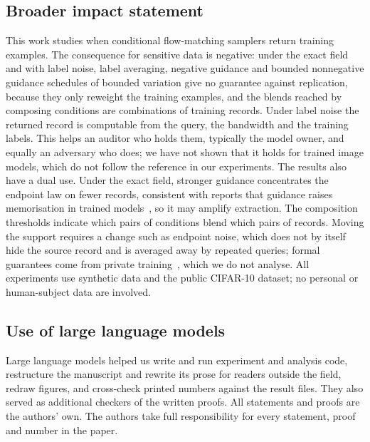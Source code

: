 \documentclass{article} %
\theoremstyle{plain}
\theoremstyle{definition}
\theoremstyle{remark}
\begin{document}
\subsection*{Broader impact statement}
This work studies when conditional flow-matching samplers return training examples. The
consequence for sensitive data is negative: under the exact field and with label noise, label
averaging, negative guidance and bounded nonnegative guidance schedules of bounded variation give
no guarantee against replication, because
they only reweight the training examples, and the blends reached by composing conditions are
combinations of training records. Under label noise the returned record is computable from the
query, the bandwidth and the training labels. This helps an auditor who holds them, typically the
model owner, and equally an adversary who does; we have not shown that it holds for trained image
models, which do not follow the reference in our experiments. The results also have a dual use. Under
the exact field, stronger guidance concentrates the endpoint law on fewer records, consistent
with reports that guidance raises memorisation in trained models~\citep{jain2025attraction,kim2025how},
so it may amplify extraction. The composition thresholds indicate which pairs of conditions
blend which pairs of records. Moving the support requires a change such as endpoint noise, which
does not by itself hide the source record and is averaged away by repeated queries; formal
guarantees come from private training~\citep{dockhorn2023differentially}, which we do not analyse.
All experiments use synthetic data and the public CIFAR-10 dataset; no personal or human-subject
data are involved.

\subsection*{Use of large language models}
Large language models helped us write and run experiment and analysis code, restructure the
manuscript and rewrite its prose for readers outside the field, redraw figures, and cross-check
printed numbers against the result files. They also served as additional checkers of the written
proofs. All statements and proofs are the authors' own. The authors take full responsibility for
every statement, proof and number in the paper.
\end{document}
